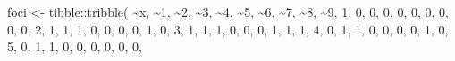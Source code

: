 \documentclass[
  letterpaper,
]{book}
\newenvironment{Shaded}{\begin{snugshade}}{\end{snugshade}}
\newcommand{\AttributeTok}[1]{\textcolor[rgb]{0.40,0.45,0.13}{#1}}
\newcommand{\DecValTok}[1]{\textcolor[rgb]{0.68,0.00,0.00}{#1}}
\newcommand{\FunctionTok}[1]{\textcolor[rgb]{0.28,0.35,0.67}{#1}}
\newcommand{\NormalTok}[1]{\textcolor[rgb]{0.00,0.23,0.31}{#1}}
\newcommand{\OtherTok}[1]{\textcolor[rgb]{0.00,0.23,0.31}{#1}}
\newcommand{\SpecialCharTok}[1]{\textcolor[rgb]{0.37,0.37,0.37}{#1}}
\newcommand{\StringTok}[1]{\textcolor[rgb]{0.13,0.47,0.30}{#1}}
\begin{document}
\begin{Shaded}
\begin{Highlighting}[]
\NormalTok{foci }\OtherTok{\textless{}{-}}\NormalTok{ tibble}\SpecialCharTok{::}\FunctionTok{tribble}\NormalTok{(}
           \SpecialCharTok{\textasciitilde{}}\NormalTok{x, }\SpecialCharTok{\textasciitilde{}}\StringTok{\textasciigrave{}}\AttributeTok{1}\StringTok{\textasciigrave{}}\NormalTok{, }\SpecialCharTok{\textasciitilde{}}\StringTok{\textasciigrave{}}\AttributeTok{2}\StringTok{\textasciigrave{}}\NormalTok{, }\SpecialCharTok{\textasciitilde{}}\StringTok{\textasciigrave{}}\AttributeTok{3}\StringTok{\textasciigrave{}}\NormalTok{, }\SpecialCharTok{\textasciitilde{}}\StringTok{\textasciigrave{}}\AttributeTok{4}\StringTok{\textasciigrave{}}\NormalTok{, }\SpecialCharTok{\textasciitilde{}}\StringTok{\textasciigrave{}}\AttributeTok{5}\StringTok{\textasciigrave{}}\NormalTok{, }\SpecialCharTok{\textasciitilde{}}\StringTok{\textasciigrave{}}\AttributeTok{6}\StringTok{\textasciigrave{}}\NormalTok{, }\SpecialCharTok{\textasciitilde{}}\StringTok{\textasciigrave{}}\AttributeTok{7}\StringTok{\textasciigrave{}}\NormalTok{, }\SpecialCharTok{\textasciitilde{}}\StringTok{\textasciigrave{}}\AttributeTok{8}\StringTok{\textasciigrave{}}\NormalTok{, }\SpecialCharTok{\textasciitilde{}}\StringTok{\textasciigrave{}}\AttributeTok{9}\StringTok{\textasciigrave{}}\NormalTok{,}
           \DecValTok{1}\NormalTok{,   }\DecValTok{0}\NormalTok{,   }\DecValTok{0}\NormalTok{,   }\DecValTok{0}\NormalTok{,   }\DecValTok{0}\NormalTok{,   }\DecValTok{0}\NormalTok{,   }\DecValTok{0}\NormalTok{,   }\DecValTok{0}\NormalTok{,   }\DecValTok{0}\NormalTok{,   }\DecValTok{0}\NormalTok{,}
           \DecValTok{2}\NormalTok{,   }\DecValTok{1}\NormalTok{,   }\DecValTok{1}\NormalTok{,   }\DecValTok{1}\NormalTok{,   }\DecValTok{0}\NormalTok{,   }\DecValTok{0}\NormalTok{,   }\DecValTok{0}\NormalTok{,   }\DecValTok{0}\NormalTok{,   }\DecValTok{1}\NormalTok{,   }\DecValTok{0}\NormalTok{,}
           \DecValTok{3}\NormalTok{,   }\DecValTok{1}\NormalTok{,   }\DecValTok{1}\NormalTok{,   }\DecValTok{1}\NormalTok{,   }\DecValTok{0}\NormalTok{,   }\DecValTok{0}\NormalTok{,   }\DecValTok{0}\NormalTok{,   }\DecValTok{1}\NormalTok{,   }\DecValTok{1}\NormalTok{,   }\DecValTok{1}\NormalTok{,}
           \DecValTok{4}\NormalTok{,   }\DecValTok{0}\NormalTok{,   }\DecValTok{1}\NormalTok{,   }\DecValTok{1}\NormalTok{,   }\DecValTok{0}\NormalTok{,   }\DecValTok{0}\NormalTok{,   }\DecValTok{0}\NormalTok{,   }\DecValTok{0}\NormalTok{,   }\DecValTok{1}\NormalTok{,   }\DecValTok{0}\NormalTok{,}
           \DecValTok{5}\NormalTok{,   }\DecValTok{0}\NormalTok{,   }\DecValTok{1}\NormalTok{,   }\DecValTok{1}\NormalTok{,   }\DecValTok{0}\NormalTok{,   }\DecValTok{0}\NormalTok{,   }\DecValTok{0}\NormalTok{,   }\DecValTok{0}\NormalTok{,   }\DecValTok{0}\NormalTok{,   }\DecValTok{0}\NormalTok{,}

\end{Highlighting}
\end{Shaded}
\end{document}
